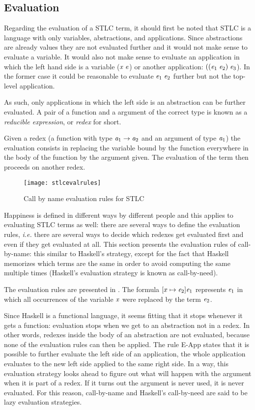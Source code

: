 \subsection{Evaluation}
\label{stlceval}
Regarding the evaluation of a STLC term, it should first be noted that STLC is a language with only variables, abstractions, and applications. Since abstractions are already values they are not evaluated further and it would not make sense to evaluate a variable. It would also not make sense to evaluate an application in which the left hand side is a variable ($\mathit{x}\; \mathit{e}$) or another application: $((\mathit{e}_1\;\mathit{e}_2)\;\mathit{e}_3$). In the former case it could be reasonable to evaluate $\mathit{e}_1\;\mathit{e}_2$ further but not the top-level application. 

As such, only applications in which the left side is an abstraction can be further evaluated. A pair of a function and a argument of the correct type is known as a \textit{reducible expression}, or \textit{redex} for short.

Given a redex (a function with type $\mathit{a}_1\to\mathit{a}_2$ and an argument of type $\mathit{a}_1$) the evaluation consists in replacing the variable bound by the function everywhere in the body of the function by the argument given. The evaluation of the term then proceeds on another redex.

\begin{figure}
  \centering
  \texttt{[image: stlcevalrules]}
  \caption{Call by name evaluation rules for STLC}
  \label{STLC eval}
\end{figure}

Happiness is defined in different ways by different people and this applies to evaluating STLC terms as well: there are several ways to define the evaluation rules, \textit{i.e.} there are several ways to decide which redexes get evaluated first and even if they get evaluated at all. This section presents the evaluation rules of call-by-name: this similar to Haskell's strategy, except for the fact that Haskell memorizes which terms are the same in order to avoid computing the same multiple times (Haskell's evaluation strategy is known as call-by-need).

The evaluation rules are presented in . The formula $[x\mapsto\mathit{e}_2]\mathit{e}_1$ represents $\mathit{e}_1$ in which all occurrences of the variable $\mathit{x}$ were replaced by the term $\mathit{e}_2$.

Since Haskell is a functional language, it seems fitting that it stops whenever it gets a function: evaluation stops when we get to an abstraction not in a redex. In other words, redexes inside the body of an abstraction are not evaluated, because none of the evaluation rules can then be applied. The rule E-App states that it is possible to further evaluate the left side of an application, the whole application evaluates to the new left side applied to the same right side. In a way, this evaluation strategy looks ahead to figure out what will happen with the argument when it is part of a redex. If it turns out the argument is never used, it is never evaluated. For this reason, call-by-name and Haskell's call-by-need are said to be lazy evaluation strategies.

